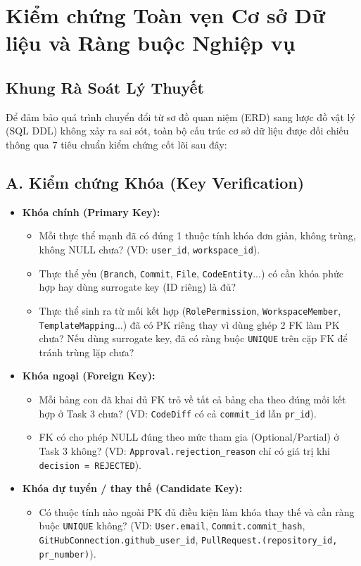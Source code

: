 
\section{Kiểm chứng Toàn vẹn Cơ sở Dữ liệu và Ràng buộc Nghiệp vụ}

\subsection{Khung Rà Soát Lý Thuyết}

Để đảm bảo quá trình chuyển đổi từ sơ đồ quan niệm (ERD) sang lược đồ vật lý (SQL DDL) không xảy ra sai sót, toàn bộ cấu trúc cơ sở dữ liệu được đối chiếu thông qua 7 tiêu chuẩn kiểm chứng cốt lõi sau đây:

\subsection{A. Kiểm chứng Khóa (Key Verification)}
\begin{itemize}
    \item \textbf{Khóa chính (Primary Key):}
    \begin{itemize}
        \item Mỗi thực thể mạnh đã có đúng 1 thuộc tính khóa đơn giản, không trùng, không NULL chưa? (VD: \texttt{user\_id}, \texttt{workspace\_id}).
        \item Thực thể yếu (\texttt{Branch}, \texttt{Commit}, \texttt{File}, \texttt{CodeEntity}...) có cần khóa phức hợp hay dùng surrogate key (ID riêng) là đủ?
        \item Thực thể sinh ra từ mối kết hợp (\texttt{RolePermission}, \texttt{WorkspaceMember}, \texttt{TemplateMapping}...) đã có PK riêng thay vì dùng ghép 2 FK làm PK chưa? Nếu dùng surrogate key, đã có ràng buộc \texttt{UNIQUE} trên cặp FK để tránh trùng lặp chưa?
    \end{itemize}
    \item \textbf{Khóa ngoại (Foreign Key):}
    \begin{itemize}
        \item Mỗi bảng con đã khai đủ FK trỏ về tất cả bảng cha theo đúng mối kết hợp ở Task 3 chưa? (VD: \texttt{CodeDiff} có cả \texttt{commit\_id} lẫn \texttt{pr\_id}).
        \item FK có cho phép NULL đúng theo mức tham gia (Optional/Partial) ở Task 3 không? (VD: \texttt{Approval.rejection\_reason} chỉ có giá trị khi \texttt{decision = REJECTED}).
    \end{itemize}
    \item \textbf{Khóa dự tuyển / thay thế (Candidate Key):}
    \begin{itemize}
        \item Có thuộc tính nào ngoài PK đủ điều kiện làm khóa thay thế và cần ràng buộc \texttt{UNIQUE} không? (VD: \texttt{User.email}, \texttt{Commit.commit\_hash}, \texttt{GitHubConnection.github\_user\_id}, \texttt{PullRequest.(repository\_id, pr\_number)}).
    \end{itemize}
\end{itemize}

